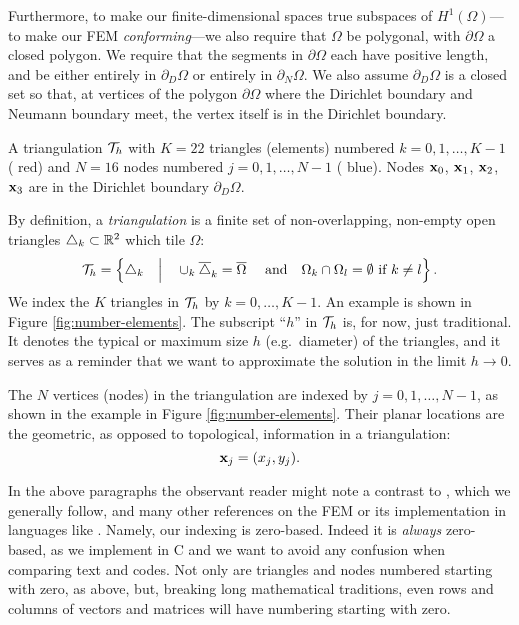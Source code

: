 Furthermore, to make our finite-dimensional spaces true subspaces of $H^1(\Omega)$---to make our FEM \emph{conforming}---we also require that $\Omega$ be polygonal, with $\partial\Omega$ a closed polygon.  We require that the segments in $\partial\Omega$ each have positive length, and be either entirely in $\partial_D\Omega$ or entirely in $\partial_N\Omega$.  We also assume $\partial_D\Omega$ is a closed set so that, at vertices of the polygon $\partial \Omega$ where the Dirichlet boundary and Neumann boundary meet, the vertex itself is in the Dirichlet boundary.

\begin{marginfigure}

\caption{A triangulation $\mathcal{T}_h$ with $K=22$ triangles (elements) numbered $k=0,1,\dots,K-1$ ({\color{red} red}) and $N=16$ nodes numbered $j=0,1,\dots,N-1$  ({\color{blue} blue}).  Nodes $\mathbf{x}_0$, $\mathbf{x}_1$, $\mathbf{x}_2$, $\mathbf{x}_3$ are in the Dirichlet boundary $\partial_D\Omega$.}
\label{fig:number-elements}
\end{marginfigure}

By definition, a \emph{triangulation} is a finite set of non-overlapping, non-empty open triangles $\triangle_k\subset \mathbb{R}^2$ which tile $\Omega$:
\begin{equation*}
\mathcal{T}_h = \left\{\triangle_k \quad\Big|\quad \cup_k \overline{\triangle}_k = \overline{\Omega} \quad \text{ and} \quad \Omega_k \cap \Omega_l = \emptyset \text{ if } k\ne l\right\}.
\end{equation*}
We index the $K$ triangles in $\mathcal{T}_h$ by $k=0,\dots,K-1$.  An example is shown in Figure \ref{fig:number-elements}.  The subscript ``$h$'' in $\mathcal{T}_h$ is, for now, just traditional.  It denotes the typical or maximum size $h$ (e.g.~diameter) of the triangles, and it serves as a reminder that we want to approximate the solution in the limit $h\to 0$.

The $N$ vertices (nodes) in the triangulation are indexed by $j=0,1,\dots,N-1$, as shown in the example in Figure \ref{fig:number-elements}.  Their planar locations are the geometric, as opposed to topological, information in a triangulation:
\begin{equation*}
\mathbf{x}_j = (x_j,y_j).
\end{equation*}

In the above paragraphs the observant reader might note a contrast to \citet{Elmanetal2005}, which we generally follow, and many other references on the FEM or its implementation in languages like \Matlab.  Namely, our indexing is zero-based.  Indeed it is \emph{always} zero-based, as we implement in C and we want to avoid any confusion when comparing text and codes.  Not only are triangles and nodes numbered starting with zero, as above, but, breaking long mathematical traditions, even rows and columns of vectors and matrices will have numbering starting with zero.
 
